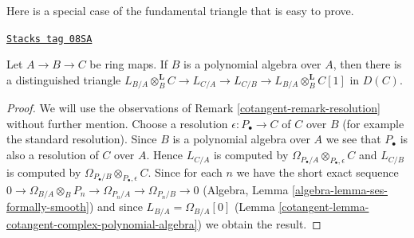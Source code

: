 Here is a special case of the fundamental triangle that is easy to prove.

\begin{lemma}
\label{cotangent-lemma-special-case-triangle}
\href{https://stacks.math.columbia.edu/tag/08SA}{\texttt{Stacks tag 08SA}}

Let $A \to B \to C$ be ring maps. If $B$ is a polynomial algebra over
$A$, then there is a distinguished triangle
$L_{B/A} \otimes_B^\mathbf{L} C \to L_{C/A} \to L_{C/B} \to
L_{B/A} \otimes_B^\mathbf{L} C[1]$ in $D(C)$.
\end{lemma}

\begin{proof}

We will use the observations of Remark \ref{cotangent-remark-resolution}
without further mention. Choose a resolution $\epsilon : P_\bullet \to C$
of $C$ over $B$ (for example the standard resolution). Since $B$ is a
polynomial algebra over $A$ we see that $P_\bullet$ is also a resolution of
$C$ over $A$. Hence $L_{C/A}$ is computed by
$\Omega_{P_\bullet/A} \otimes_{P_\bullet, \epsilon} C$
and $L_{C/B}$ is computed by
$\Omega_{P_\bullet/B} \otimes_{P_\bullet, \epsilon} C$.
Since for each $n$ we have the short exact sequence
$0 \to \Omega_{B/A} \otimes_B P_n \to \Omega_{P_n/A} \to \Omega_{P_n/B} \to 0$
(Algebra, Lemma \ref{algebra-lemma-ses-formally-smooth})
and since $L_{B/A} = \Omega_{B/A}[0]$
(Lemma \ref{cotangent-lemma-cotangent-complex-polynomial-algebra})
we obtain the result.
\end{proof}

